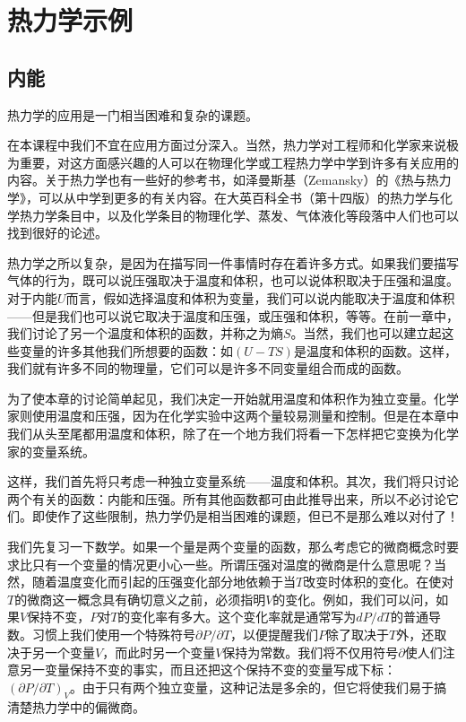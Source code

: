 \chapter{热力学示例}

\section{内能}

热力学的应用是一门相当困难和复杂的课题。

在本课程中我们不宜在应用方面过分深入。当然，热力学对工程师和化学家来说极为重要，对这方面感兴趣的人可以在物理化学或工程热力学中学到许多有关应用的内容。关于热力学也有一些好的参考书，如泽曼斯基（Zemansky）的《热与热力学》，可以从中学到更多的有关内容。在大英百科全书（第十四版）的热力学与化学热力学条目中，以及化学条目的物理化学、蒸发、气体液化等段落中人们也可以找到很好的论述。

热力学之所以复杂，是因为在描写同一件事情时存在着许多方式。如果我们要描写气体的行为，既可以说压强取决于温度和体积，也可以说体积取决于压强和温度。对于内能$U$而言，假如选择温度和体积为变量，我们可以说内能取决于温度和体积——但是我们也可以说它取决于温度和压强，或压强和体积，等等。在前一章中，我们讨论了另一个温度和体积的函数，并称之为熵$S$。当然，我们也可以建立起这些变量的许多其他我们所想要的函数：如$(U-TS)$是温度和体积的函数。这样，我们就有许多不同的物理量，它们可以是许多不同变量组合而成的函数。

为了使本章的讨论简单起见，我们决定一开始就用温度和体积作为独立变量。化学家则使用温度和压强，因为在化学实验中这两个量较易测量和控制。但是在本章中我们从头至尾都用温度和体积，除了在一个地方我们将看一下怎样把它变换为化学家的变量系统。

这样，我们首先将只考虑一种独立变量系统——温度和体积。其次，我们将只讨论两个有关的函数：内能和压强。所有其他函数都可由此推导出来，所以不必讨论它们。即使作了这些限制，热力学仍是相当困难的课题，但已不是那么难以对付了！

我们先复习一下数学。如果一个量是两个变量的函数，那么考虑它的微商概念时要求比只有一个变量的情况更小心一些。所谓压强对温度的微商是什么意思呢？当然，随着温度变化而引起的压强变化部分地依赖于当$T$改变时体积的变化。在使对$T$的微商这一概念具有确切意义之前，必须指明$V$的变化。例如，我们可以问，如果$V$保持不变，$P$对$T$的变化率有多大。这个变化率就是通常写为$dP /dT$的普通导数。习惯上我们使用一个特殊符号$\partial P /\partial T$，以便提醒我们$P$除了取决于$T$外，还取决于另一个变量$V$，而此时另一个变量$V$保持为常数。我们将不仅用符号$\partial$使人们注意另一变量保持不变的事实，而且还把这个保持不变的变量写成下标：$(\partial P /\partial T)_V$。由于只有两个独立变量，这种记法是多余的，但它将使我们易于搞清楚热力学中的偏微商。


